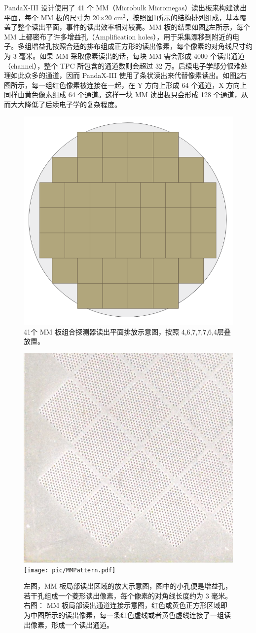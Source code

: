 PandaX-III 设计使用了 41 个 MM（Microbulk Micromegas）读出板来构建读出平面，每个 MM 板的尺寸为 20$\times$20 cm$^2$，按照图\ref{fig:mms}所示的结构排列组成，基本覆盖了整个读出平面，事件的读出效率相对较高。MM 板的结果如图\ref{fig:mm_detail}左所示，每个 MM 上都密布了许多增益孔（Amplification holes），用于采集漂移到附近的电子。多组增益孔按照合适的排布组成正方形的读出像素，每个像素的对角线尺寸约为 3 毫米。如果 MM 采取像素读出的话，每块 MM 需会形成 4000 个读出通道（channel），整个 TPC 所包含的通道数则会超过 32 万。后续电子学部分很难处理如此众多的通道，因而 PandaX-III 使用了条状读出来代替像素读出。如图\ref{fig:mm_detail}右图所示，每一组红色像素被连接在一起，在 Y 方向上形成 64 个通道，X 方向上同样由黄色像素组成 64 个通道。这样一块 MM 读出板只会形成 128 个通道，从而大大降低了后续电子学的复杂程度。

\begin{figure}[hbt]
    \centering
    \includegraphics[width=0.4\columnwidth]{pic/fig8.png}
    \caption{41个 MM 板组合探测器读出平面排放示意图，按照 4,6,7,7,7,6,4层叠放置。}
    \label{fig:mms}
\end{figure}

\begin{figure}
    \centering
    \includegraphics[width=0.4\columnwidth]{pic/MMStrips.jpg}
    \texttt{[image: pic/MMPattern.pdf]}
    \caption{左图，MM 板局部读出区域的放大示意图，图中的小孔便是增益孔，若干孔组成一个菱形读出像素，每个像素的对角线长度约为 3 毫米。右图： MM 板局部读出通道连接示意图，红色或黄色正方形区域即为中图所示的读出像素，每一条红色虚线或者黄色虚线连接了一组读出像素，形成一个读出通道。\supercite{lin2018design}}
    \label{fig:mm_detail}
\end{figure}

